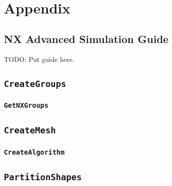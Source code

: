 
\chapter{Appendix} %
\label{cha:appendix}

\section{NX Advanced Simulation Guide} %
\label{sec:nx_advanced_simulation_guide}
TODO: Put guide here.


\section{\texttt{CreateGroups}} %
\label{sec:creategroups}

\subsection{\texttt{GetNXGroups}} %
\label{sub:getnxgroups}


\section{\texttt{CreateMesh}} %
\label{sec:createmesh}

\subsection{\texttt{CreateAlgorithm}} %
\label{sub:createalgorithm}


\section{\texttt{PartitionShapes}} %
\label{sec:partitionshapes}

